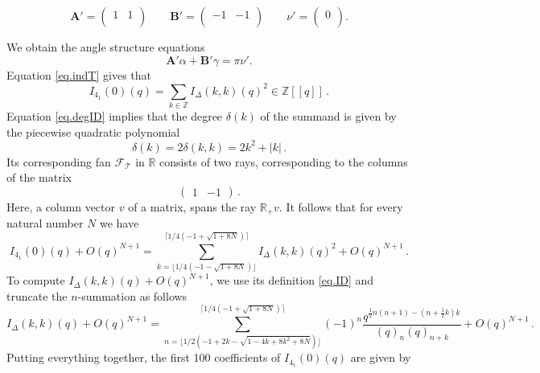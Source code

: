 \documentclass[12pt]{amsart}
\theoremstyle{definition}
\theoremstyle{remark}
\def\BZ{\mathbb Z}
\def\BR{\mathbb R}
\def\calF{\mathcal F}
\def\a{\alpha}
\def\d{\delta}
\def\lbl{\label}
\newcommand{\CT}{\mathcal{T}}
\def\be{  \begin{equation} }
\def\ee{  \end{equation} }
\def\ID{I_{\Delta}}
\newcommand{\mb}{\mathbf}
\begin{document}
$$
\mb A'= 
\left(
\begin{array}{cc}
 1 & 1 \\
\end{array}
\right)
\qquad 
\mb B'= 
\left(
\begin{array}{cc}
 -1 & -1 \\
\end{array}
\right)
\qquad 
\nu'=
\left(
\begin{array}{c}
 0 \\
\end{array}
\right).
$$

We obtain the angle structure equations  $$
\mb A' \a + \mb B' \gamma = \pi \nu'. 
$$
Equation \eqref{eq.indT} gives that
$$
I_{4_1}(0)(q)=\sum_{k \in \BZ} \ID(k,k)(q)^2 \in \BZ[[q]] \, .
$$
Equation \eqref{eq.degID} implies that
the degree $\d(k)$ of the summand is given by the piecewise quadratic polynomial
$$
\d(k)=2 \d(k,k)= 2 k^2 + |k| \, .
$$
Its corresponding fan
$\calF_{\CT}$ in $\BR$ consists of two rays, corresponding to the columns of the matrix
$$
\left(
\begin{array}{cc}
 1 & -1
\end{array}
\right)\, .
$$
Here, a column vector $v$ of a matrix, spans the ray $\BR_+ v$.
It follows that for every natural number $N$ we have
$$
I_{4_1}(0)(q) + O(q)^{N+1}=
\sum_{k=\lfloor 1/4 (-1 - \sqrt{1 + 8 N}) \rfloor}^{\lceil 
1/4 (-1 + \sqrt{1 + 8 N}) \rceil }
\ID(k,k)(q)^2 + O(q)^{N+1} \, .
$$
To compute $\ID(k,k)(q) +  O(q)^{N+1}$, we use its definition \eqref{eq.ID}
and truncate the $n$-summation as follows
\be
\lbl{eq.IDtruncated}
\ID(k,k)(q) +  O(q)^{N+1}=
\sum_{n=\lfloor 1/2 (-1 + 2 k - \sqrt{1 - 4 k + 8 k^2 + 8 N}) \rfloor }^{
\lceil 1/4 (-1 + \sqrt{1 + 8 N}) \rceil } 
(-1)^n \frac{q^{\frac{1}{2}n(n+1)
-\left(n+\frac{1}{2}k\right)k}}{(q)_n(q)_{n+k}} + O(q)^{N+1} \, .
\ee
Putting everything together, the first 100 coefficients of $I_{4_1}(0)(q)$
are given by
\end{document}
